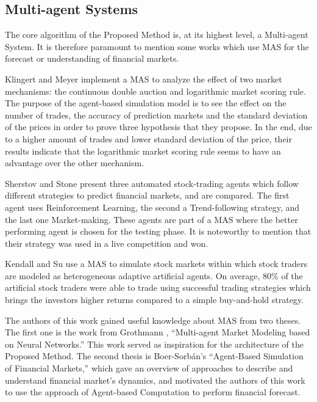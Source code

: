\subsection{Multi-agent Systems}
\label{multi-agent-systems}

The core algorithm of the Proposed Method is, at its highest level, a Multi-agent System. It is therefore paramount to mention some works which use MAS for the forecast or understanding of financial markets.

Klingert and Meyer \cite{Klingert_2012} implement a MAS to analyze the effect of two market mechanisms: the continuous double auction and logarithmic market scoring rule. The purpose of the agent-based simulation model is to see the effect on the number of trades, the accuracy of prediction markets and the standard deviation of the prices in order to prove three hypothesis that they propose. In the end, due to a higher amount of trades and lower standard deviation of the price, their results indicate that the logarithmic market scoring rule seems to have an advantage over the other mechanism.

Sherstov and Stone \cite{Sherstov2005} present three automated stock-trading agents which follow different strategies to predict financial markets, and are compared. The first agent uses Reinforcement Learning, the second a Trend-following strategy, and the last one Market-making. These agents are part of a MAS where the better performing agent is chosen for the testing phase. It is noteworthy to mention that their strategy was used in a live competition and won.

Kendall and Su \cite{Kendall2003} use a MAS to simulate stock markets within which stock traders are modeled as heterogeneous adaptive artificial agents. On average, 80\% of the artificial stock traders were able to trade using successful trading strategies which brings the investors higher returns compared to a simple buy-and-hold strategy.

The authors of this work gained useful knowledge about MAS from two theses. The first one is the work from Grothmann \cite{Grothmann2002}, ``Multi-agent Market Modeling based on Neural Networks.'' This work served as inspiration for the architecture of the Proposed Method. The second thesis is Boer-Sorb{\'{a}}n's ``Agent-Based Simulation of Financial Markets,'' which gave an overview of approaches to describe and understand financial market's dynamics, and motivated the authors of this work to use the approach of Agent-based Computation to perform financial forecast.

